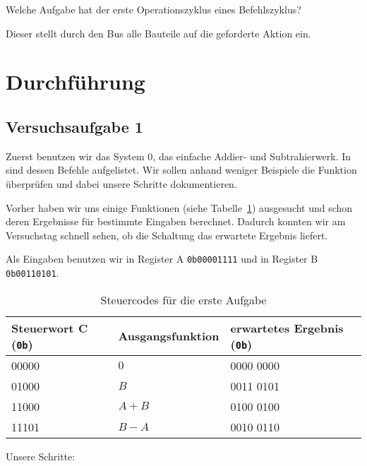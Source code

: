 \begin{problem}
	Welche Aufgabe hat der erste Operationszyklus eines Befehlszyklus?
\end{problem}

Dieser stellt durch den Bus alle Bauteile auf die geforderte Aktion ein.


\section{Durchführung}

\subsection{Versuchsaufgabe 1}

Zuerst benutzen wir das System 0, das einfache Addier- und Subtrahierwerk. In
\cite[Tabelle~8.1]{physik313-Anleitung} sind dessen Befehle aufgelistet. Wir
sollen anhand weniger Beispiele die Funktion überprüfen und dabei unsere
Schritte dokumentieren.

Vorher haben wir uns einige Funktionen (siehe Tabelle~\ref{tab:1}) ausgesucht
und schon deren Ergebnisse für bestimmte Eingaben berechnet. Dadurch konnten
wir am Versuchstag schnell sehen, ob die Schaltung das erwartete Ergebnis
liefert.

Als Eingaben benutzen wir in Register A \texttt{0b00001111} und in Register B
\texttt{0b00110101}.

\begin{table}[htbp]
	\centering
	\begin{tabular}{lll}
		Steuerwort C (\texttt{0b}) & Ausgangsfunktion & erwartetes Ergebnis
		(\texttt{0b}) \\
		\hline
		00000 & $0$ & 0000 0000 \\
		01000 & $B$ & 0011 0101 \\
		11000 & $A + B$ & 0100 0100 \\
		11101 & $B - A$ & 0010 0110
	\end{tabular}
	\caption{%
		Steuercodes für die erste Aufgabe
	}
	\label{tab:1}
\end{table}

Unsere Schritte:

